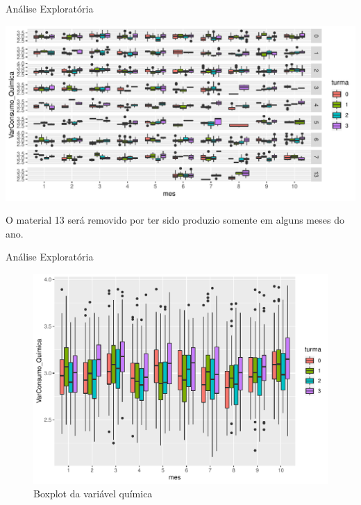 \documentclass[
  ignorenonframetext,
]{beamer}
\begin{document}
\begin{frame}{Análise Exploratória}
\protect\hypertarget{analise-exploratoria-1}{}

\begin{center}\includegraphics{apresentacao_final_files/figure-beamer/heat_count-1} \end{center}

O material 13 será removido por ter sido produzio somente em alguns
meses do ano.

\end{frame}

\begin{frame}{Análise Exploratória}
\protect\hypertarget{analise-exploratoria-2}{}

\begin{figure}

{\centering \includegraphics{apresentacao_final_files/figure-beamer/plot_eletrica-1} 

}

\caption{Boxplot da variável química}\label{fig:plot_eletrica}
\end{figure}

\end{frame}
\end{document}

